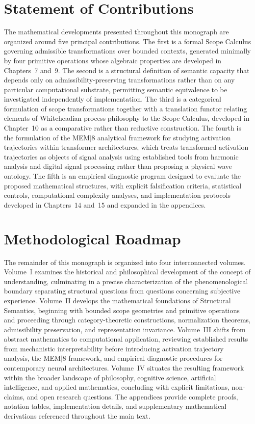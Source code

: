 \documentclass[11pt,twoside,openright]{book}
\numberwithin{equation}{chapter}
\theoremstyle{definition}
\theoremstyle{plain}
\theoremstyle{remark}
\theoremstyle{definition}
\begin{document}
\section{Statement of Contributions}

The mathematical developments presented throughout this monograph are
organized around five principal contributions. The first is a formal
Scope Calculus governing admissible transformations over bounded
contexts, generated minimally by four primitive operations whose
algebraic properties are developed in Chapters~7 and~9. The second is a
structural definition of semantic capacity that depends only on
admissibility-preserving transformations rather than on any particular
computational substrate, permitting semantic equivalence to be
investigated independently of implementation. The third is a categorical
formulation of scope transformations together with a translation functor
relating elements of Whiteheadian process philosophy to the Scope
Calculus, developed in Chapter~10 as a comparative rather than reductive
construction. The fourth is the formulation of the MEM$|$8 analytical
framework for studying activation trajectories within transformer
architectures, which treats transformed activation trajectories as
objects of signal analysis using established tools from harmonic analysis
and digital signal processing rather than proposing a physical wave
ontology. The fifth is an empirical diagnostic program designed to
evaluate the proposed mathematical structures, with explicit falsification
criteria, statistical controls, computational complexity analyses, and
implementation protocols developed in Chapters~14 and~15 and expanded in
the appendices.

\section{Methodological Roadmap}

The remainder of this monograph is organized into four interconnected
volumes. Volume~I examines the historical and philosophical development
of the concept of understanding, culminating in a precise characterization
of the phenomenological boundary separating structural questions from
questions concerning subjective experience. Volume~II develops the
mathematical foundations of Structural Semantics, beginning with bounded
scope geometries and primitive operations and proceeding through
category-theoretic constructions, normalization theorems, admissibility
preservation, and representation invariance. Volume~III shifts from
abstract mathematics to computational application, reviewing established
results from mechanistic interpretability before introducing activation
trajectory analysis, the MEM$|$8 framework, and empirical diagnostic
procedures for contemporary neural architectures. Volume~IV situates the
resulting framework within the broader landscape of philosophy, cognitive
science, artificial intelligence, and applied mathematics, concluding
with explicit limitations, non-claims, and open research questions. The
appendices provide complete proofs, notation tables, implementation
details, and supplementary mathematical derivations referenced throughout
the main text.
\end{document}
